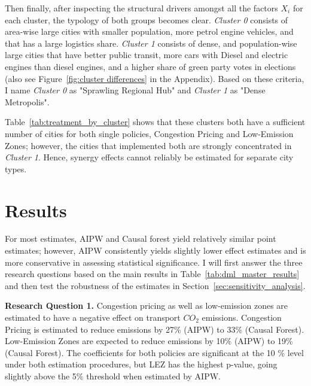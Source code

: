 \documentclass[12pt, a4paper]{article}
\begin{document}
Then finally, after inspecting the structural drivers amongst all the factors $X_i$ for each cluster, the typology of both groups becomes clear. \textit{Cluster 0} consists of area-wise large cities with smaller population, more petrol engine vehicles, and that has a large logistics share. \textit{Cluster 1} consists of dense, and population-wise large cities that have better public transit, more cars with Diesel and electric engines than diesel engines, and a higher share of green party votes in elections (also see Figure~\ref{fig:cluster differences} in the Appendix). Based on these criteria, I name \textit{Cluster 0} as "Sprawling Regional Hub" and \textit{Cluster 1} as "Dense Metropolis".



Table~\ref{tab:treatment_by_cluster} shows that these clusters both have a sufficient number of cities for both single policies, Congestion Pricing and Low-Emission Zones; however, the cities that implemented both are strongly concentrated in \textit{Cluster 1}. Hence, synergy effects cannot reliably be estimated for separate city types.

\section{Results}
\label{sec:results}

For most estimates, AIPW and Causal forest yield relatively similar point estimates; however, AIPW consistently yields slightly lower effect estimates and is more conservative in assessing statistical significance. I  will first answer the three research questions based on the main results in Table~\ref{tab:dml_master_results} and then test the robustness of the estimates in Section~\ref{sec:sensitivity_analysis}.



\textbf{Research Question 1. } Congestion pricing as well as low-emission zones are estimated to have a negative effect on transport $CO_2$ emissions. Congestion Pricing is estimated to reduce emissions by 27\% (AIPW) to 33\% (Causal Forest). Low-Emission Zones are expected to reduce emissions by 10\% (AIPW) to 19\% (Causal Forest). The coefficients for both policies are significant at the 10 \% level under both estimation procedures, but LEZ has the highest p-value, going slightly above the 5\% threshold when estimated by AIPW.
\end{document}
